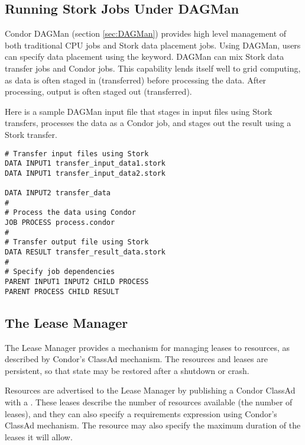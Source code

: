 \subsection{\label{sec:Stork-Advanced}Running Stork Jobs Under DAGMan}

Condor DAGMan (section \ref{sec:DAGMan}) provides high level management
of both traditional CPU jobs and Stork data placement jobs. 
Using DAGMan, users can specify data placement
using the  keyword.
DAGMan can mix Stork data transfer jobs 
and Condor jobs.
This capability lends itself well to grid computing,
as data is often staged in (transferred)
before processing the data.
After processing, output is often staged out (transferred).

Here is a sample DAGMan input file
that stages in input files using Stork transfers,
processes the data as a Condor job,
and stages out the result using a Stork transfer.

\footnotesize
\begin{verbatim}
# Transfer input files using Stork
DATA INPUT1 transfer_input_data1.stork
DATA INPUT1 transfer_input_data2.stork

DATA INPUT2 transfer_data
#
# Process the data using Condor
JOB PROCESS process.condor
#
# Transfer output file using Stork
DATA RESULT transfer_result_data.stork
#
# Specify job dependencies
PARENT INPUT1 INPUT2 CHILD PROCESS
PARENT PROCESS CHILD RESULT
\end{verbatim}
\normalsize

\subsection{\label{sec:Stork-Lease-Manager}The Lease Manager}

The Lease Manager provides a mechanism for managing leases to resources, 
as described by Condor's ClassAd mechanism.  
The resources and leases are persistent,
so that state may be restored after a shutdown or crash.

Resources are advertised to the Lease Manager by publishing a Condor ClassAd 
with a .
These leases describe the number of resources available (the number of leases),
and they can also specify a requirements expression 
using Condor's ClassAd mechanism.
The resource may also specify the maximum 
duration of the leases it will allow.

